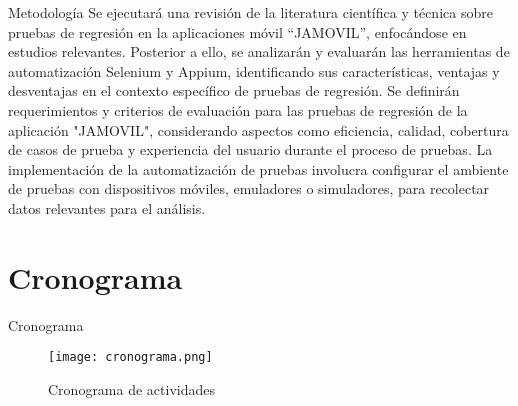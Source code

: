 \documentclass{beamer}
\begin{document}
\begin{frame}{Metodología}
\justify
Se ejecutará una revisión de la literatura científica y técnica sobre pruebas de regresión en la aplicaciones móvil “JAMOVIL”, enfocándose en estudios relevantes. Posterior a ello, se analizarán y evaluarán las herramientas de automatización Selenium y Appium, identificando sus características, ventajas y desventajas en el contexto específico de pruebas de regresión.
\newline
\newline
Se definirán requerimientos y criterios de evaluación para las pruebas de regresión de la aplicación "JAMOVIL", considerando aspectos como eficiencia, calidad, cobertura de casos de prueba y experiencia del usuario durante el proceso de pruebas.
La implementación de la automatización de pruebas involucra configurar el ambiente de pruebas con dispositivos móviles, emuladores o simuladores,  para recolectar datos relevantes para el análisis.
\end{frame}


\section{Cronograma}

\begin{frame}{Cronograma}
\begin{figure}[h]
\centering
\texttt{[image: cronograma.png]}
\caption{Cronograma de actividades}
\label{FIG1:1}
\end{figure}
\end{frame}
\end{document}
